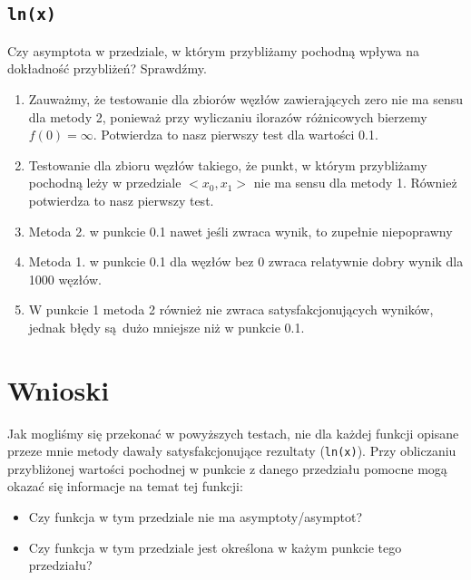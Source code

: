 \documentclass[a4paper,10pt]{article}
\begin{document}
    \subsection{\texttt{ln(x)}}
    Czy asymptota w przedziale, w którym przybliżamy pochodną wpływa na dokładność przybliżeń?
    Sprawdźmy.
     \begin{enumerate}
      \item Zauważmy, że testowanie dla zbiorów węzłów zawierających zero nie ma sensu dla metody 2,
      ponieważ przy wyliczaniu ilorazów różnicowych bierzemy $f(0) = \infty$. Potwierdza to nasz pierwszy
      test dla wartości 0.1.
      \item Testowanie dla zbioru węzłów takiego, że punkt, w którym przybliżamy pochodną leży
      w przedziale $<x_0, x_1>$ nie ma sensu dla metody 1. Również potwierdza to nasz pierwszy test.
      \item Metoda 2. w punkcie 0.1 nawet jeśli zwraca wynik, to zupełnie niepoprawny
      \item Metoda 1. w punkcie 0.1 dla węzłów bez 0 zwraca relatywnie dobry wynik dla 1000 węzłów.
      \item W punkcie 1 metoda 2 również nie zwraca satysfakcjonujących wyników, jednak błędy
      są dużo mniejsze niż w punkcie 0.1.
     \end{enumerate}


   \section{Wnioski}
   Jak mogliśmy się przekonać w powyższych testach, nie dla każdej funkcji opisane przeze mnie metody
   dawały satysfakcjonujące rezultaty (\texttt{ln(x)}). Przy obliczaniu przybliżonej wartości pochodnej
   w punkcie z danego przedziału pomocne mogą okazać się informacje na temat tej funkcji:
   
   \begin{itemize}
    \item Czy funkcja w tym przedziale nie ma asymptoty/asymptot?
    \item Czy funkcja w tym przedziale jest określona w każym punkcie tego przedziału?
   \end{itemize}
   
\end{document}
